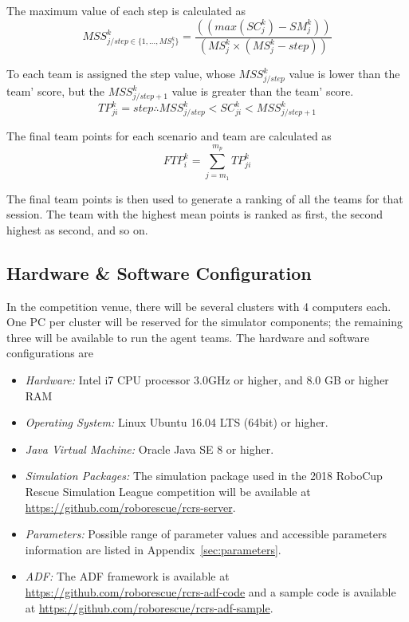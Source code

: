 \documentclass{article}
\begin{document}
The maximum value of each step is calculated as
\begin{equation}
MSS_{j/step \in \{1,\dots,MS_{j}^{k}\}}^{k} = \frac{\left( \left( max \left( 
SC_{j}^{k} \right) - SM_{j}^{k} \right) \right)}{\left( MS_{j}^{k} \times 
\left( MS_{j}^{k} - step \right) \right)}
\end{equation}

To each team is assigned the step value, whose $MSS_{j/step}^{k}$ value is 
lower than the team' score, but the $MSS_{j/step+1}^{k}$ value is greater than 
the team' score.
\begin{equation}
TP_{ji}^{k} = step \therefore MSS_{j/step}^{k} < SC_{ji}^{k} < 
MSS_{j/step+1}^{k}
\end{equation}

The final team points for each scenario and team are calculated as
\begin{equation}
FTP_{i}^{k} = \sum_{j=m_{1}}^{m_{p}}{TP_{ji}^{k}}
\end{equation}

The final team points is then used to generate a ranking of all the teams for 
that session. The team with the highest mean points is ranked as first, the 
second highest as second, and so on.
\subsection{Hardware \& Software Configuration}
In the competition venue, there will be several clusters with 4 computers each. 
One PC per cluster will be reserved for the simulator components; the remaining 
three will be available to run the agent teams. The hardware and software 
configurations are
\begin{itemize}
\item[] \emph{Hardware:} Intel i7 CPU processor 3.0GHz or higher, and 8.0 GB or 
higher RAM
\item[] \emph{Operating System:} Linux Ubuntu 16.04 LTS (64bit) or higher.
\item[] \emph{Java Virtual Machine:} Oracle Java SE 8 or higher.
\item[] \emph{Simulation Packages:} The simulation package used in the 2018 
RoboCup Rescue Simulation League competition will be available at
\url{https://github.com/roborescue/rcrs-server}.
\item[] \emph{Parameters:} Possible range of parameter values and accessible 
parameters information are listed in Appendix~\ref{sec:parameters}.
\item[] \emph{ADF:} The ADF framework is available at
\url{https://github.com/roborescue/rcrs-adf-code} and a sample code is
available at \url{https://github.com/roborescue/rcrs-adf-sample}.
\end{itemize}
\end{document}
